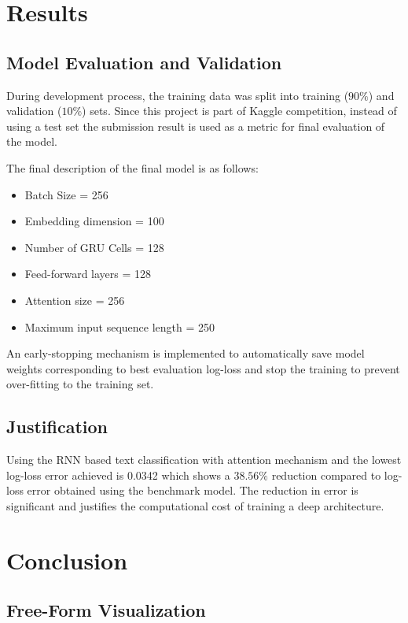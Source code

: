 \documentclass{article}
\begin{document}
\section{Results}

    \subsection{Model Evaluation and Validation}

    During development process, the training data was split into training ($90\%$) and validation ($10\%$) sets. Since this project is part of Kaggle competition, instead of using a test set the submission result is used as a metric for final evaluation of the model.

    The final description of the final model is as follows:


    \begin{itemize}
        \item Batch Size = 256
        \item Embedding dimension = 100
        \item Number of GRU Cells = 128
        \item Feed-forward layers = 128
        \item Attention size = 256
        \item Maximum input sequence length = 250
    \end{itemize}

    An early-stopping mechanism is implemented to automatically save model weights corresponding to best evaluation log-loss and stop the training to prevent over-fitting to the training set.


    \subsection{Justification}

    Using the RNN based text classification with attention mechanism and the lowest log-loss error achieved is 0.0342 which shows a $38.56\%$ reduction compared to log-loss error obtained using the benchmark model. The reduction in error is significant and justifies the computational cost of training a deep architecture.


\section{Conclusion}


    \subsection{Free-Form Visualization}
\end{document}
